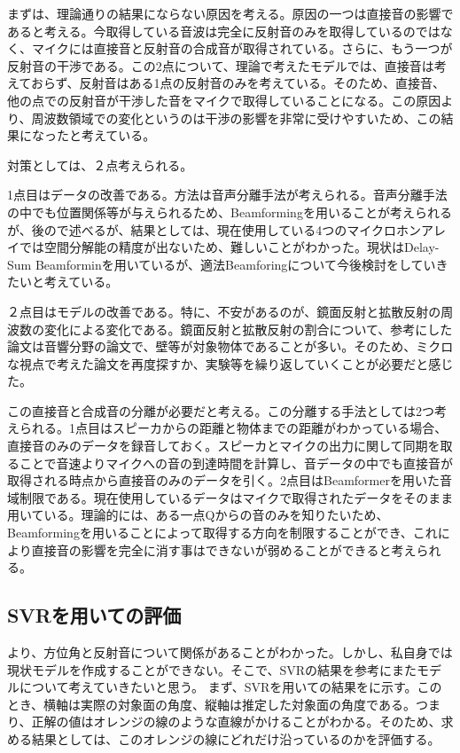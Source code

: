  まずは、理論通りの結果にならない原因を考える。原因の一つは直接音の影響であると考える。今取得している音波は完全に反射音のみを取得しているのではなく、マイクには直接音と反射音の合成音が取得されている。さらに、もう一つが反射音の干渉である。この2点について、理論で考えたモデルでは、直接音は考えておらず、反射音はある1点の反射音のみを考えている。そのため、直接音、他の点での反射音が干渉した音をマイクで取得していることになる。この原因より、周波数領域での変化というのは干渉の影響を非常に受けやすいため、この結果になったと考えている。
 
 対策としては、２点考えられる。
 
 1点目はデータの改善である。方法は音声分離手法が考えられる。音声分離手法の中でも位置関係等が与えられるため、Beamformingを用いることが考えられるが、後ので述べるが、結果としては、現在使用している4つのマイクロホンアレイでは空間分解能の精度が出ないため、難しいことがわかった。現状はDelay-Sum Beamforminを用いているが、適法Beamforingについて今後検討をしていきたいと考えている。
 
 ２点目はモデルの改善である。特に、不安があるのが、鏡面反射と拡散反射の周波数の変化による変化である。鏡面反射と拡散反射の割合について、参考にした論文は音響分野の論文で、壁等が対象物体であることが多い。そのため、ミクロな視点で考えた論文を再度探すか、実験等を繰り返していくことが必要だと感じた。
 
 
 この直接音と合成音の分離が必要だと考える。この分離する手法としては2つ考えられる。1点目はスピーカからの距離と物体までの距離がわかっている場合、直接音のみのデータを録音しておく。スピーカとマイクの出力に関して同期を取ることで音速よりマイクへの音の到達時間を計算し、音データの中でも直接音が取得される時点から直接音のみのデータを引く。2点目はBeamformerを用いた音域制限である。現在使用しているデータはマイクで取得されたデータをそのまま用いている。理論的には、ある一点Qからの音のみを知りたいため、Beamformingを用いることによって取得する方向を制限することができ、これにより直接音の影響を完全に消す事はできないが弱めることができると考えられる。

\fi

\newpage

\subsection{SVRを用いての評価}
\label{sec:result_svr}
より、方位角と反射音について関係があることがわかった。しかし、私自身では現状モデルを作成することができない。そこで、SVRの結果を参考にまたモデルについて考えていきたいと思う。
まず、SVRを用いての結果をに示す。このとき、横軸は実際の対象面の角度、縦軸は推定した対象面の角度である。つまり、正解の値はオレンジの線のような直線がかけることがわかる。そのため、求める結果としては、このオレンジの線にどれだけ沿っているのかを評価する。

